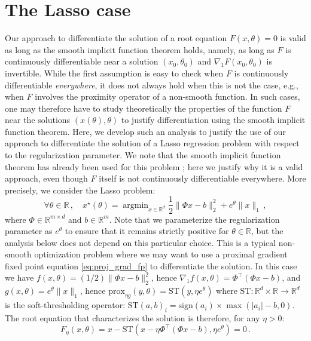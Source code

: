 \documentclass{article}
\def\RR{{\mathbb R}}
\def\prox{{\text{prox}}}
\def\sign{{\text{sign}}}
\def\ST{{\text{ST}}}
\DeclareMathOperator*{\argmin}{argmin}
\def\dataMatrix{\Phi}
\begin{document}
\section{The Lasso case}\label{sec:lasso}
Our approach to differentiate the solution of a root equation $F(x,\theta)=0$ is valid as long as the smooth implicit function theorem holds, namely, as long as $F$ is continuously differentiable near a solution $(x_0,\theta_0)$ and $\nabla_1 F(x_0,\theta_0)$ is invertible. While the first assumption is easy to check when $F$ is continuously differentiable \emph{everywhere}, it does not always hold when this is not the case, e.g., when $F$ involves the proximity operator of a non-smooth function. In such cases, one may therefore have to study theoretically the properties of the function $F$ near the solutions $(x(\theta),\theta)$ to justify differentiation using the smooth implicit function theorem. Here, we develop such an analysis to justify the use of our approach to differentiate the solution of a Lasso regression problem with respect to the regularization parameter. We note that the smooth implicit function theorem has already been used for this problem \cite{bertrand_2020_implicit,bertrand_2021_journal}; here we justify why it is a valid approach, even though $F$ itself is not continuously differentiable everywhere. More precisely, we consider the Lasso problem:
\begin{equation}\label{eq:lasso}
\forall \theta\in\RR\,,\quad x^\star(\theta) = \argmin_{x\in\RR^d} \frac{1}{2}\|\dataMatrix x - b\|^2_2 + e^\theta \|x\|_1\,,
\end{equation}
where $\dataMatrix\in\RR^{m\times d}$ and $b\in\RR^m$. Note that we parameterize the regularization parameter as $e^\theta$ to ensure that it remains strictly positive for $\theta\in\RR$, but the analysis below does not depend on this particular choice. This is a typical non-smooth optimization problem where we may want to use a proximal gradient fixed point equation \eqref{eq:proj_grad_fp} to differentiate the solution. In this case we have $f(x,\theta)=(1/2)\|\dataMatrix x-b\|^2_2$, hence $\nabla_1f(x,\theta) = \dataMatrix^\top(\dataMatrix x - b)$, and $g(x,\theta)=e^\theta\|x\|_1$, hence $\prox_{\eta g}(y,\theta) = \ST(y,\eta e^\theta)$ where $\ST:\RR^d \times \RR \rightarrow \RR^d$ is the soft-thresholding operator: $\ST(a,b)_i = \sign(a_i)\times \max(|a_i|-b,0)$. The root equation that characterizes the solution is therefore, for any $\eta>0$:
\begin{equation}
F_\eta(x,\theta) = x - \ST\left(x-\eta \dataMatrix^\top(\dataMatrix x - b), \eta e^\theta\right) = 0\,.
\label{eq:Flasso}
\end{equation}
\end{document}
